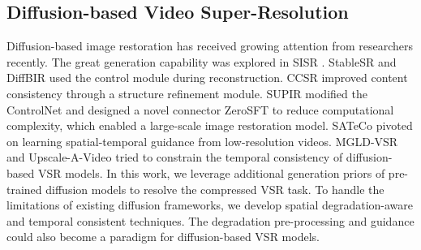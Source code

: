 \subsection{Diffusion-based Video Super-Resolution}
Diffusion-based image restoration has received growing attention from researchers recently. The great generation capability was explored in SISR \cite{SR3}. StableSR \cite{StableSR} and DiffBIR \cite{StableSR} used the control module during reconstruction. CCSR \cite{CCSR} improved content consistency through a structure refinement module. SUPIR \cite{SUPIR} modified the ControlNet and designed a novel connector ZeroSFT to reduce computational complexity, which enabled a large-scale image restoration model. SATeCo \cite{SATeCo} pivoted on learning spatial-temporal guidance from low-resolution videos. MGLD-VSR \cite{MGLD-VSR} and Upscale-A-Video \cite{Upscale-A-Video} tried to constrain the temporal consistency of diffusion-based VSR models. In this work, we leverage additional generation priors of pre-trained diffusion models to resolve the compressed VSR task. To handle the limitations of existing diffusion frameworks, we develop spatial degradation-aware and temporal consistent techniques. The degradation pre-processing and guidance could also become a paradigm for diffusion-based VSR models.